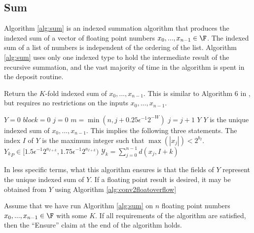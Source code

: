  \subsection{Sum}
    \label{sec:compositeops_sum}
    Algorithm \ref{alg:sum} is an indexed summation algorithm that produces the indexed sum of a vector of floating point numbers $x_0, ..., x_{n - 1} \in \F$.
    The indexed sum of a list of numbers is independent of the ordering of the list.
    Algorithm \ref{alg:sum} uses only one indexed type to hold the intermediate result of the recursive summation, and the vast majority of time in the algorithm is spent in the deposit routine.
    \begin{samepage}
    \begin{alg}
      Return the $K$-fold indexed sum of $x_0, ..., x_{n-1}$.
      This is similar to Algorithm $6$ in \cite{repsum}, but requires no restrictions on the inputs $x_0, ..., x_{n - 1}$.
      \begin{algorithmic}[1]
          \State $Y = 0$
          \State $block = 0$
          \State $j = 0$ \label{alg:sum:setj}
          \label{alg:sum:outerloop}
            \State $m = \min(n, j + 0.25\epsilon^{-1}2^{-W})$
            \State \Call{Update}{K, $\max([|x_j|, ..., |x_{m - 1}|)$, Y}\label{alg:sum:update}
              \State {}
              \State $j = j + 1$
            \EndWhile
            \State {}\label{alg:sum:renorm}
          \EndWhile
          \State \Return $Y$
        \EndFunction
        \Ensure
        \Statex $Y$ is the unique indexed sum of $x_0, ..., x_{n - 1}$. This implies the following three statements.
        \Statex The index $I$ of $Y$ is the maximum integer such that $\max(|x_j|) < 2^{b_I}$.
        \Statex ${Y_k}_P \in [1.5  \epsilon^{-1} 2^{a_{I + k}}, 1.75  \epsilon^{-1} 2^{a_{I + k}})$
        \Statex $\mathcal{Y}_k = \sum\limits_{j = 0}^{n - 1}d(x_j, I + k)$
      \end{algorithmic}
      \label{alg:sum}
    \end{alg}
    \end{samepage}
    In less specific terms, what this algorithm ensures is that the fields of $Y$ represent the unique indexed sum of $Y$. If a floating point result is desired, it may be obtained from $Y$ using Algorithm \ref{alg:conv2floatoverflow}
    \begin{samepage}
    \begin{thm}
      Assume that we have run Algorithm \ref{alg:sum} on $n$ floating point numbers $x_0, ..., x_{n - 1} \in \F$ with some $K$. If all requirements of the algorithm are satisfied, then the ``Ensure'' claim at the end of the algorithm holds.
      \label{thm:sum}
    \end{thm}
    \end{samepage}
